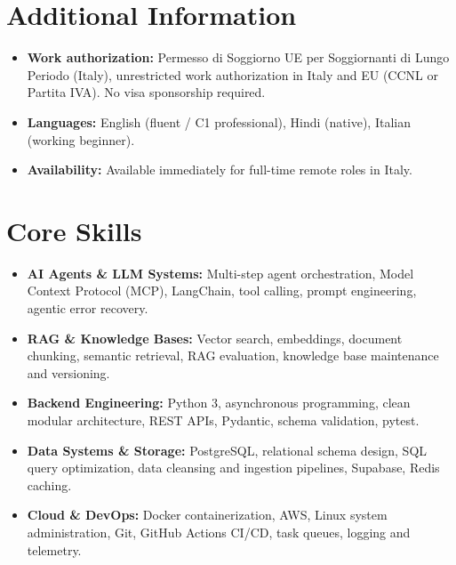 \documentclass[a4paper,10pt]{article}
\begin{document}
\section{Additional Information}
\begin{itemize}
 \item \textbf{Work authorization:} Permesso di Soggiorno UE per Soggiornanti di Lungo Periodo (Italy), unrestricted work authorization in Italy and EU (CCNL or Partita IVA). No visa sponsorship required.
 \item \textbf{Languages:} English (fluent / C1 professional), Hindi (native), Italian (working beginner).
 \item \textbf{Availability:} Available immediately for full-time remote roles in Italy.
\end{itemize}

\section{Core Skills}
\begin{itemize}
 \item \textbf{AI Agents \& LLM Systems:} Multi-step agent orchestration, Model Context Protocol (MCP), LangChain, tool calling, prompt engineering, agentic error recovery.
 \item \textbf{RAG \& Knowledge Bases:} Vector search, embeddings, document chunking, semantic retrieval, RAG evaluation, knowledge base maintenance and versioning.
 \item \textbf{Backend Engineering:} Python 3, asynchronous programming, clean modular architecture, REST APIs, Pydantic, schema validation, pytest.
 \item \textbf{Data Systems \& Storage:} PostgreSQL, relational schema design, SQL query optimization, data cleansing and ingestion pipelines, Supabase, Redis caching.
 \item \textbf{Cloud \& DevOps:} Docker containerization, AWS, Linux system administration, Git, GitHub Actions CI/CD, task queues, logging and telemetry.
\end{itemize}
\end{document}
